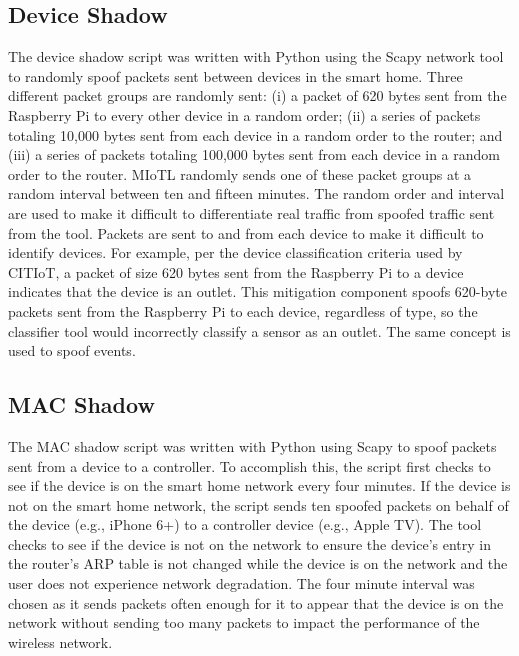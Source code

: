 \documentclass[journal]{./IEEEtran/IEEEtran}
\begin{document}
\subsection{Device Shadow}
The device shadow script was written with Python using the Scapy network tool to randomly spoof packets sent between devices in the smart home. Three different packet groups are randomly sent: (i) a packet of 620 bytes sent from the Raspberry Pi to every other device in a random order; (ii) a series of packets totaling 10,000 bytes sent from each device in a random order to the router; and (iii) a series of packets totaling 100,000 bytes sent from each device in a random order to the router. \ac{MIoTL} randomly sends one of these packet groups at a random interval between ten and fifteen minutes. The random order and interval are used to make it difficult to differentiate real traffic from spoofed traffic sent from the tool. Packets are sent to and from each device to make it difficult to identify devices. For example, per the device classification criteria used by \ac{CITIoT}, a packet of size 620 bytes sent from the Raspberry Pi to a device indicates that the device is an outlet. This mitigation component spoofs 620-byte packets sent from the Raspberry Pi to each device, regardless of type, so the classifier tool would incorrectly classify a sensor as an outlet. The same concept is used to spoof events.

\subsection{MAC Shadow}
The \ac{MAC} shadow script was written with Python using Scapy to spoof packets sent from a device to a controller. To accomplish this, the script first checks to see if the device  is on the smart home network every four minutes. If the device is not on the smart home network, the script sends ten spoofed packets on behalf of the device (e.g., iPhone 6+) to a controller device (e.g., Apple TV). The tool checks to see if the device is not on the network to ensure the device's entry in the router's \ac{ARP} table is not changed while the device is on the network and the user does not experience network degradation. The four minute interval was chosen as it sends packets often enough for it to appear that the device is on the network without sending too many packets to impact the performance of the wireless network.
\end{document}
